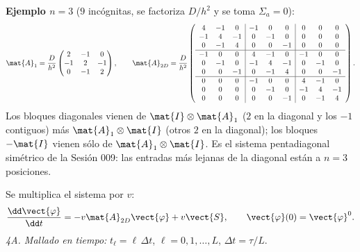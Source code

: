 \noindent\textbf{Ejemplo $n = 3$} ($9$ incógnitas, se factoriza $D/h^2$ y se toma $\Sigma_a = 0$):
\[
  \mat{A}_1 = \frac{D}{h^2}\begin{pmatrix} 2 & -1 & 0\\ -1 & 2 & -1\\ 0 & -1 & 2\end{pmatrix},
  \qquad
  \mat{A}_{2D} = \frac{D}{h^2}\left(
  \begin{array}{ccc|ccc|ccc}
     4 & -1 &  0 & -1 &  0 &  0 &  0 &  0 &  0\\
    -1 &  4 & -1 &  0 & -1 &  0 &  0 &  0 &  0\\
     0 & -1 &  4 &  0 &  0 & -1 &  0 &  0 &  0\\ \hline
    -1 &  0 &  0 &  4 & -1 &  0 & -1 &  0 &  0\\
     0 & -1 &  0 & -1 &  4 & -1 &  0 & -1 &  0\\
     0 &  0 & -1 &  0 & -1 &  4 &  0 &  0 & -1\\ \hline
     0 &  0 &  0 & -1 &  0 &  0 &  4 & -1 &  0\\
     0 &  0 &  0 &  0 & -1 &  0 & -1 &  4 & -1\\
     0 &  0 &  0 &  0 &  0 & -1 &  0 & -1 &  4
  \end{array}\right).
\]
Los bloques diagonales vienen de $\mat{I}\otimes\mat{A}_1$ ($2$ en la diagonal y los $-1$ contiguos) más
$\mat{A}_1\otimes\mat{I}$ (otros $2$ en la diagonal); los bloques $-\mat{I}$ vienen sólo de
$\mat{A}_1\otimes\mat{I}$. Es el sistema pentadiagonal simétrico de la Sesión 009: las entradas más lejanas de la diagonal están a $n = 3$ posiciones.

Se multiplica el sistema por $v$:
\[
  \frac{\dd\vect{\varphi}}{\dd t} = -v\mat{A}_{2D}\vect{\varphi} + v\vect{S}, \qquad \vect{\varphi}(0) = \vect{\varphi}^0 .
\]
\emph{4A. Mallado en tiempo:} $t_\ell = \ell\,\Delta t$, $\ell = 0, 1, \dots, L$, $\Delta t = \tau/L$.

